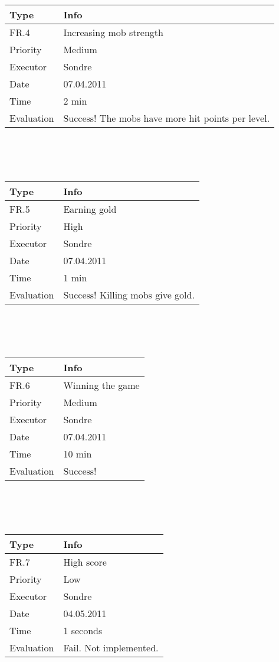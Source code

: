   \\
  \\
  \\
  \begin{tabular}{|l |p{10cm} |}
	\hline	
	\textbf{Type} & \textbf{Info} \\
	\hline
	FR.4 & Increasing mob strength\\
	\hline
	Priority & Medium  \\
	\hline
	Executor & Sondre  \\
	\hline
	Date & 07.04.2011 \\
	\hline
	Time & 2 min \\
	\hline
	Evaluation & Success! The mobs have more hit points per level. \\
	\hline
  \end{tabular}
  \\
  \\
  \\
  \begin{tabular}{|l | p{10cm} |}
	\hline	
	\textbf{Type} & \textbf{Info} \\
	\hline
	FR.5 & Earning gold \\
	\hline
	Priority & High  \\
	\hline
	Executor & Sondre  \\
	\hline
	Date & 07.04.2011 \\
	\hline
	Time & 1 min \\
	\hline
	Evaluation & Success! Killing mobs give gold. \\
	\hline
  \end{tabular}
  \\
  \\
  \\
  \begin{tabular}{|l | p{10cm} |}
	\hline	
	\textbf{Type} & \textbf{Info} \\
	\hline
	FR.6 & Winning the game \\
	\hline
	Priority & Medium \\
	\hline
	Executor & Sondre  \\
	\hline
	Date & 07.04.2011 \\
	\hline
	Time & 10 min \\
	\hline
	Evaluation & Success! \\
	\hline
  \end{tabular}
  \\
  \\
  \\
  \begin{tabular}{|l | p{10cm} |}
	\hline	
	\textbf{Type} & \textbf{Info} \\
	\hline
	FR.7 & High score \\
	\hline
	Priority & Low  \\
	\hline
	Executor & Sondre  \\
	\hline
	Date & 04.05.2011 \\
	\hline
	Time & 1 seconds \\
	\hline
	Evaluation & Fail. Not implemented. \\
	\hline
  \end{tabular}
